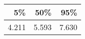 \begin{table}[ht]
\centering
\begin{tabular}{rrr}
  \hline
5\% & 50\% & 95\% \\ 
  \hline
4.211 & 5.593 & 7.630 \\ 
   \hline
\end{tabular}
\end{table}
